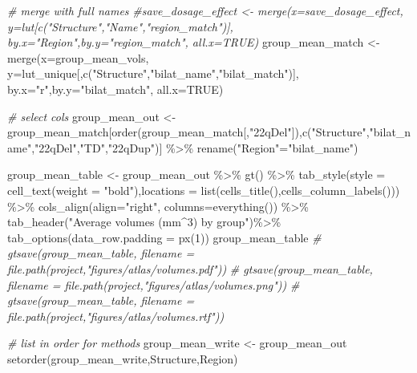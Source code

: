 \documentclass[
]{article}
\newenvironment{Shaded}{\begin{snugshade}}{\end{snugshade}}
\newcommand{\AttributeTok}[1]{\textcolor[rgb]{0.77,0.63,0.00}{#1}}
\newcommand{\CommentTok}[1]{\textcolor[rgb]{0.56,0.35,0.01}{\textit{#1}}}
\newcommand{\ConstantTok}[1]{\textcolor[rgb]{0.00,0.00,0.00}{#1}}
\newcommand{\DecValTok}[1]{\textcolor[rgb]{0.00,0.00,0.81}{#1}}
\newcommand{\FunctionTok}[1]{\textcolor[rgb]{0.00,0.00,0.00}{#1}}
\newcommand{\NormalTok}[1]{#1}
\newcommand{\OtherTok}[1]{\textcolor[rgb]{0.56,0.35,0.01}{#1}}
\newcommand{\SpecialCharTok}[1]{\textcolor[rgb]{0.00,0.00,0.00}{#1}}
\newcommand{\StringTok}[1]{\textcolor[rgb]{0.31,0.60,0.02}{#1}}
\begin{document}
\begin{Shaded}
\begin{Highlighting}[]
\CommentTok{\# merge with full names}
\CommentTok{\#save\_dosage\_effect \textless{}{-} merge(x=save\_dosage\_effect, y=lut[c("Structure","Name","region\_match")], by.x="Region",by.y="region\_match", all.x=TRUE)}
\NormalTok{group\_mean\_match }\OtherTok{\textless{}{-}} \FunctionTok{merge}\NormalTok{(}\AttributeTok{x=}\NormalTok{group\_mean\_vols, }\AttributeTok{y=}\NormalTok{lut\_unique[,}\FunctionTok{c}\NormalTok{(}\StringTok{"Structure"}\NormalTok{,}\StringTok{"bilat\_name"}\NormalTok{,}\StringTok{"bilat\_match"}\NormalTok{)], }\AttributeTok{by.x=}\StringTok{"r"}\NormalTok{,}\AttributeTok{by.y=}\StringTok{"bilat\_match"}\NormalTok{, }\AttributeTok{all.x=}\ConstantTok{TRUE}\NormalTok{)}

\CommentTok{\# select cols}
\NormalTok{group\_mean\_out }\OtherTok{\textless{}{-}}\NormalTok{ group\_mean\_match[}\FunctionTok{order}\NormalTok{(group\_mean\_match[,}\StringTok{"22qDel"}\NormalTok{]),}\FunctionTok{c}\NormalTok{(}\StringTok{"Structure"}\NormalTok{,}\StringTok{"bilat\_name"}\NormalTok{,}\StringTok{"22qDel"}\NormalTok{,}\StringTok{"TD"}\NormalTok{,}\StringTok{"22qDup"}\NormalTok{)] }\SpecialCharTok{\%\textgreater{}\%} \FunctionTok{rename}\NormalTok{(}\StringTok{"Region"}\OtherTok{=}\StringTok{"bilat\_name"}\NormalTok{)}

\NormalTok{group\_mean\_table }\OtherTok{\textless{}{-}}\NormalTok{ group\_mean\_out }\SpecialCharTok{\%\textgreater{}\%} \FunctionTok{gt}\NormalTok{() }\SpecialCharTok{\%\textgreater{}\%} 
  \FunctionTok{tab\_style}\NormalTok{(}\AttributeTok{style =} \FunctionTok{cell\_text}\NormalTok{(}\AttributeTok{weight =} \StringTok{"bold"}\NormalTok{),}\AttributeTok{locations =} \FunctionTok{list}\NormalTok{(}\FunctionTok{cells\_title}\NormalTok{(),}\FunctionTok{cells\_column\_labels}\NormalTok{())) }\SpecialCharTok{\%\textgreater{}\%}
  \FunctionTok{cols\_align}\NormalTok{(}\AttributeTok{align=}\StringTok{"right"}\NormalTok{, }\AttributeTok{columns=}\FunctionTok{everything}\NormalTok{()) }\SpecialCharTok{\%\textgreater{}\%} 
  \FunctionTok{tab\_header}\NormalTok{(}\StringTok{"Average volumes (mm\^{}3) by group"}\NormalTok{)}\SpecialCharTok{\%\textgreater{}\%}
  \FunctionTok{tab\_options}\NormalTok{(}\AttributeTok{data\_row.padding =} \FunctionTok{px}\NormalTok{(}\DecValTok{1}\NormalTok{)) }
\NormalTok{group\_mean\_table}
\CommentTok{\# gtsave(group\_mean\_table, filename = file.path(project,"figures/atlas/volumes.pdf"))}
\CommentTok{\# gtsave(group\_mean\_table, filename = file.path(project,"figures/atlas/volumes.png"))}
\CommentTok{\# gtsave(group\_mean\_table, filename = file.path(project,"figures/atlas/volumes.rtf"))}

\CommentTok{\# list in order for methods}
\NormalTok{group\_mean\_write }\OtherTok{\textless{}{-}}\NormalTok{ group\_mean\_out}
\FunctionTok{setorder}\NormalTok{(group\_mean\_write,Structure,Region)}
\end{Highlighting}
\end{Shaded}
\end{document}
